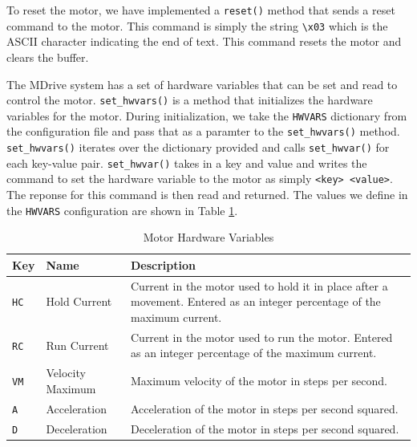 To reset the motor, we have implemented a \texttt{reset()} method that sends a reset command to the motor.
This command is simply the string \texttt{\textbackslash x03} which is the ASCII character indicating the end of text.
This command resets the motor and clears the buffer.

The MDrive system has a set of hardware variables that can be set and read to control the motor.
\texttt{set\_hwvars()} is a method that initializes the hardware variables for the motor.
During initialization, we take the \texttt{HWVARS} dictionary from the configuration file and pass that as a paramter to the \texttt{set\_hwvars()} method.
\texttt{set\_hwvars()} iterates over the dictionary provided and calls \texttt{set\_hwvar()} for each key-value pair.
\texttt{set\_hwvar()} takes in a key and value and writes the command to set the hardware variable to the motor as simply \texttt{<key> <value>}.
The reponse for this command is then read and returned.
The values we define in the \texttt{HWVARS} configuration are shown in Table \ref{chap2/table:motor_hwvars}.

\begin{table}
    \centering
    \begin{tabularx}{\textwidth}{l|l|X}
        \textbf{Key} & \textbf{Name} & \textbf{Description} \\ \hline    
        \texttt{HC} & Hold Current & Current in the motor used to hold it in place after a movement. Entered as an integer percentage of the maximum current.\\
        \texttt{RC} & Run Current & Current in the motor used to run the motor. Entered as an integer percentage of the maximum current.\\
        \texttt{VM} & Velocity Maximum & Maximum velocity of the motor in steps per second.\\
        \texttt{A} & Acceleration & Acceleration of the motor in steps per second squared.\\
        \texttt{D} & Deceleration & Deceleration of the motor in steps per second squared.
    \end{tabularx}
    \label{chap2/table:motor_hwvars}
    \caption{Motor Hardware Variables}
\end{table}

